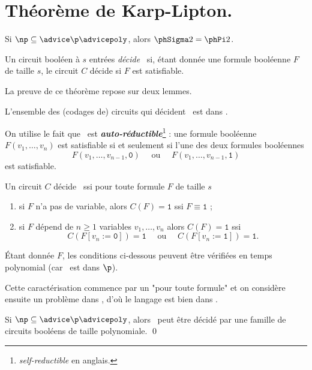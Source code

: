 \documentclass[./main]{subfiles}
\begin{document}
  \section{Théorème de Karp-Lipton.}

  \begin{thm}
    Si $\np \subseteq \advice \p \advicepoly$, alors $\phSigma 2 = \phPi 2$.
  \end{thm}

  \begin{defn}
    Un circuit booléen à $s$ entrées \textit{décide \pbSat}\ si, étant donnée une formule booléenne $F$ de taille  $s$, le circuit $C$ décide si $F$ est satisfiable.
  \end{defn}

  La preuve de ce théorème repose sur deux lemmes.

  \begin{lem}
    L'ensemble des (codages de) circuits qui décident \pbSat\ est dans \conp.
    \label{lem:karp-lipton-lem1}
  \end{lem}
  \begin{prv}
    On utilise le fait que \pbSat\ est \textit{\textbf{auto-réductible}}\footnote{\textit{self-reductible} en anglais.} : une formule booléenne $F(v_1, \ldots, v_n)$ est satisfiable si et seulement si l'une des deux formules booléennes
    \[
    F(v_1, \ldots, v_{n-1}, \texttt{0}) \quad \text{ ou } \quad F(v_1, \ldots, v_{n-1}, \texttt{1})
    \]
    est satisfiable.

    Un circuit $C$ décide \pbSat\ ssi pour toute formule $F$ de taille $s$ 
    \begin{enumerate}
      \item si $F$ n'a pas de variable, alors $C(F) = \texttt{1}$ ssi $F \equiv \texttt{1}$ ;
      \item si $F$ dépend de $n \ge 1$ variables $v_1, \ldots, v_n$ alors $C(F) = \texttt{1}$ ssi
        \[
          C(F[v_n := \texttt{0}]) = \texttt{1} \quad \text{ ou }\quad C(F[v_n := \texttt{1}]) = \texttt{1}
        .\]
    \end{enumerate}
    Étant donnée $F$, les conditions ci-dessous peuvent être vérifiées en temps polynomial (car \pbValCirc\ est dans $\p$).

    Cette caractérisation commence par un "pour toute formule" et on considère ensuite un problème dans \p, d'où le langage est bien dans \conp.
  \end{prv}

  \begin{lem}
    Si $\np \subseteq \advice \p \advicepoly$, alors \pbSat\ peut être décidé par une famille de circuits booléens de taille polynomiale.
    \qed
    \label{lem:karp-lipton-lem2}
  \end{lem}
\end{document}
